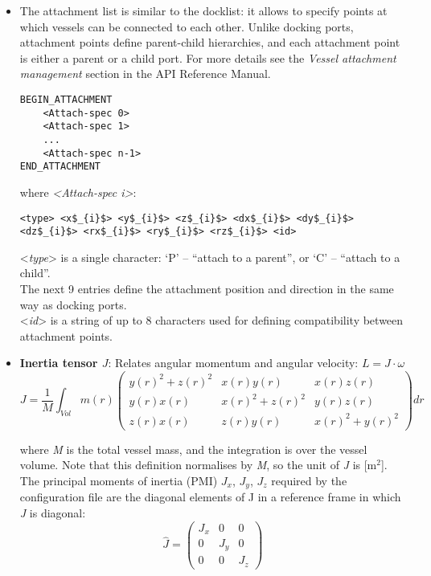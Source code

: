 \documentclass[Orbiter Developer Manual.tex]{subfiles}
\begin{document}
\begin{itemize}
\item The attachment list is similar to the docklist: it allows to specify points at which vessels can be connected to each other. Unlike docking ports, attachment points define parent-child hierarchies, and each attachment point is either a parent or a child port. For more details see the \textit{Vessel attachment management} section in the API Reference Manual.

\begin{lstlisting}[language=OSFS]
BEGIN_ATTACHMENT
	<Attach-spec 0>
	<Attach-spec 1>
	...
	<Attach-spec n-1>
END_ATTACHMENT
\end{lstlisting}

\noindent
where \textit{<Attach-spec i>}:

\begin{lstlisting}[language=OSFS,mathescape=true]
<type> <x$_{i}$> <y$_{i}$> <z$_{i}$> <dx$_{i}$> <dy$_{i}$> <dz$_{i}$> <rx$_{i}$> <ry$_{i}$> <rz$_{i}$> <id>
\end{lstlisting}

\noindent
<\textit{type}> is a single character: ‘P’ – “attach to a parent”, or ‘C’ – “attach to a child”.\\
The next 9 entries define the attachment position and direction in the same way as docking ports.\\
<\textit{id}> is a string of up to 8 characters used for defining compatibility between attachment points.

\item \textbf{Inertia tensor $J$}: Relates angular momentum and angular velocity: $L = J \cdot \omega$\\
\[ J = \frac{1}{M} \int_{Vol} m(r)  
\begin{pmatrix}
y(r)^{2} + z(r)^{2} & x(r)y(r) & x(r)z(r)\\
y(r)x(r) & x(r)^{2} + z(r)^{2} & y(r)z(r)\\
z(r)x(r) & z(r)y(r) & x(r)^{2} + y(r)^{2}
\end{pmatrix}
dr
\]

where \textit{M} is the total vessel mass, and the integration is over the vessel volume. Note that this definition normalises by \textit{M}, so the unit of \textit{J} is [m$^{2}$]. The principal moments of inertia (PMI) $J_{x}$, $J_{y}$, $J_{z}$ required by the configuration file are the diagonal elements of J in a reference frame in which \textit{J} is diagonal:
\[ \hat{J} = 
\begin{pmatrix}
J_{x} & 0 & 0\\
0 & J_{y} & 0\\
0 & 0 & J_{z}
\end{pmatrix}
\]

\end{itemize}
\end{document}
